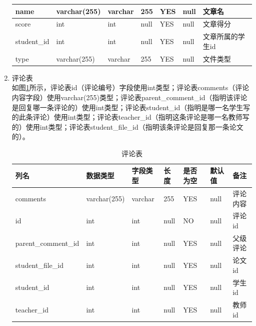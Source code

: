 \begin{enumerate}
\begin{table}[H]
\begin{tabular}{|l|l|l|l|l|l|l|}
                  name           & varchar(255) & varchar  & 255      & YES      & null   & 文章名           \\ \hline
                  score          & int          & int      & null     & YES      & null   & 文章得分         \\ \hline
                  student\_id    & int          & int      & null     & YES      & null   & 文章所属的学生id \\ \hline
                  type           & varchar(255) & varchar  & 255      & YES      & null   & 文件类型         \\ \hline
              \end{tabular}
          \end{table}
    \item 评论表\\
          如图\ref{db-comment}所示，评论表id（评论编号）字段使用int类型；评论表comments（评论内容字段）使用varchar(255)类型；评论表parent\_comment\_id（指明该评论是回复哪一条评论的）使用int类型；评论表student\_id（指明是哪一名学生写的此条评论）使用int类型；评论表teacher\_id（指明这条评论是哪一名教师写的）使用int类型；评论表student\_file\_id（指明该条评论是回复那一条论文的）。
          \begin{table}[H]
              \centering
              \song\wuhao
              \caption{评论表}
              \label{db-comment}
              \begin{tabular}{|l|l|l|l|l|l|l|}
                  \hline
                  列名                & 数据类型     & 字段类型 & 长度 & 是否为空 & 默认值 & 备注     \\ \hline
                  comments            & varchar(255) & varchar  & 255  & YES      & null   & 评论内容 \\ \hline
                  id                  & int          & int      & null & NO       & null   & 评论id   \\ \hline
                  parent\_comment\_id & int          & int      & null & YES      & null   & 父级评论 \\ \hline
                  student\_file\_id   & int          & int      & null & YES      & null   & 论文id   \\ \hline
                  student\_id         & int          & int      & null & YES      & null   & 学生id   \\ \hline
                  teacher\_id         & int          & int      & null & YES      & null   & 教师id   \\ \hline

\end{tabular}
\end{table}
\end{enumerate}
